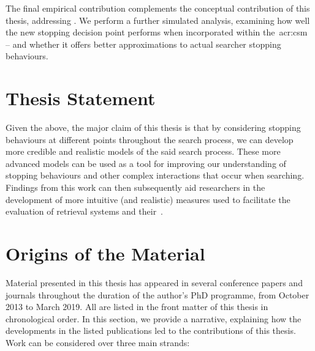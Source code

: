  The final empirical contribution complements the conceptual contribution of this thesis, addressing . We perform a further simulated analysis, examining how well the new stopping decision point performs when incorporated within the~\gls{acr:csm} -- and whether it offers better approximations to actual searcher stopping behaviours.

\section{Thesis Statement}
Given the above, the major claim of this thesis is that by considering stopping behaviours at different points throughout the search process, we can develop more credible and realistic models of the said search process. These more advanced models can be used as a tool for improving our understanding of stopping behaviours and other complex interactions that occur when searching. Findings from this work can then subsequently aid researchers in the development of more intuitive (and realistic) measures used to facilitate the evaluation of retrieval systems and their~.

%

\section{Origins of the Material}
Material presented in this thesis has appeared in several conference papers and journals throughout the duration of the author's PhD programme, from October 2013 to March 2019. All are listed in the front matter of this thesis in chronological order. In this section, we provide a narrative, explaining how the developments in the listed publications led to the contributions of this thesis. Work can be considered over three main strands:

